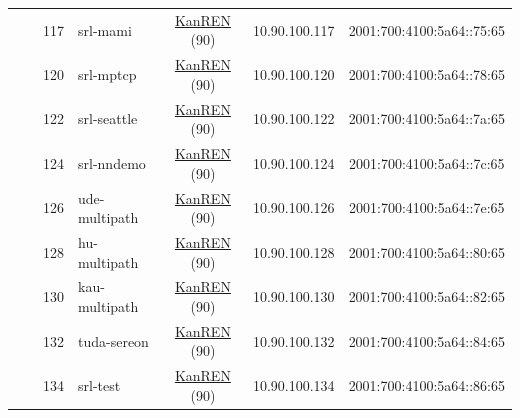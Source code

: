 \begin{small}
\begin{center}
\begin{longtable}{|c|c|c|c|c|c|c|c|}
  &  & \tiny{117} & \multicolumn{1}{|l|}{\tiny{srl-mami}} & \multicolumn{2}{|c|}{\tiny{\href{http://www.kanren.net}{KanREN} (90)}} & \tiny{10.90.100.117} & \tiny{2001:700:4100:5a64::75:65} \\* \cline{3-3}\cline{4-4}\cline{5-5}\cline{6-6}\cline{7-7}\cline{8-8}
  &  & \tiny{120} & \multicolumn{1}{|l|}{\tiny{srl-mptcp}} & \multicolumn{2}{|c|}{\tiny{\href{http://www.kanren.net}{KanREN} (90)}} & \tiny{10.90.100.120} & \tiny{2001:700:4100:5a64::78:65} \\* \cline{3-3}\cline{4-4}\cline{5-5}\cline{6-6}\cline{7-7}\cline{8-8}
  &  & \tiny{122} & \multicolumn{1}{|l|}{\tiny{srl-seattle}} & \multicolumn{2}{|c|}{\tiny{\href{http://www.kanren.net}{KanREN} (90)}} & \tiny{10.90.100.122} & \tiny{2001:700:4100:5a64::7a:65} \\* \cline{3-3}\cline{4-4}\cline{5-5}\cline{6-6}\cline{7-7}\cline{8-8}
  &  & \tiny{124} & \multicolumn{1}{|l|}{\tiny{srl-nndemo}} & \multicolumn{2}{|c|}{\tiny{\href{http://www.kanren.net}{KanREN} (90)}} & \tiny{10.90.100.124} & \tiny{2001:700:4100:5a64::7c:65} \\* \cline{3-3}\cline{4-4}\cline{5-5}\cline{6-6}\cline{7-7}\cline{8-8}
  &  & \tiny{126} & \multicolumn{1}{|l|}{\tiny{ude-multipath}} & \multicolumn{2}{|c|}{\tiny{\href{http://www.kanren.net}{KanREN} (90)}} & \tiny{10.90.100.126} & \tiny{2001:700:4100:5a64::7e:65} \\* \cline{3-3}\cline{4-4}\cline{5-5}\cline{6-6}\cline{7-7}\cline{8-8}
  &  & \tiny{128} & \multicolumn{1}{|l|}{\tiny{hu-multipath}} & \multicolumn{2}{|c|}{\tiny{\href{http://www.kanren.net}{KanREN} (90)}} & \tiny{10.90.100.128} & \tiny{2001:700:4100:5a64::80:65} \\* \cline{3-3}\cline{4-4}\cline{5-5}\cline{6-6}\cline{7-7}\cline{8-8}
  &  & \tiny{130} & \multicolumn{1}{|l|}{\tiny{kau-multipath}} & \multicolumn{2}{|c|}{\tiny{\href{http://www.kanren.net}{KanREN} (90)}} & \tiny{10.90.100.130} & \tiny{2001:700:4100:5a64::82:65} \\* \cline{3-3}\cline{4-4}\cline{5-5}\cline{6-6}\cline{7-7}\cline{8-8}
  &  & \tiny{132} & \multicolumn{1}{|l|}{\tiny{tuda-sereon}} & \multicolumn{2}{|c|}{\tiny{\href{http://www.kanren.net}{KanREN} (90)}} & \tiny{10.90.100.132} & \tiny{2001:700:4100:5a64::84:65} \\* \cline{3-3}\cline{4-4}\cline{5-5}\cline{6-6}\cline{7-7}\cline{8-8}
  &  & \tiny{134} & \multicolumn{1}{|l|}{\tiny{srl-test}} & \multicolumn{2}{|c|}{\tiny{\href{http://www.kanren.net}{KanREN} (90)}} & \tiny{10.90.100.134} & \tiny{2001:700:4100:5a64::86:65} \\* \cline{3-3}\cline{4-4}\cline{5-5}\cline{6-6}\cline{7-7}\cline{8-8}

\end{longtable}
\end{center}
\end{small}
